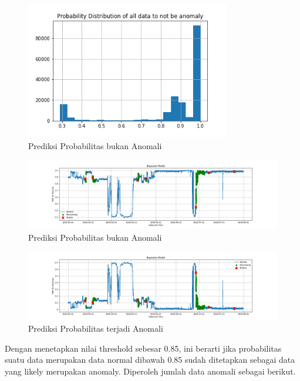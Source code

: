 \begin{figure}[H]
    \centering
    \includegraphics[width=0.8\textwidth]{resources/Bayes/Bayes_ProbDist.png}
    \caption{Prediksi Probabilitas bukan Anomali} \label{bayes_probdist}
\end{figure}
\begin{figure}[H]
    \centerline{\includegraphics[width=1.4\textwidth]{resources/Bayes/Bayes_normal_PMF.png}}
    \caption{Prediksi Probabilitas bukan Anomali} \label{bayes_normal_pmf}
\end{figure}
\begin{figure}[H]
    \centerline{\includegraphics[width=1.4\textwidth]{resources/Bayes/Bayes_anomaly_PMF.png}}
    \caption{Prediksi Probabilitas terjadi Anomali} \label{bayes_anomaly_pmf}
\end{figure}

Dengan menetapkan nilai threshold sebesar 0.85, ini berarti jika probabilitas suatu data merupakan data normal dibawah 0.85 sudah ditetapkan sebagai data yang likely merupakan anomaly. Diperoleh jumlah data anomali sebagai berikut.

